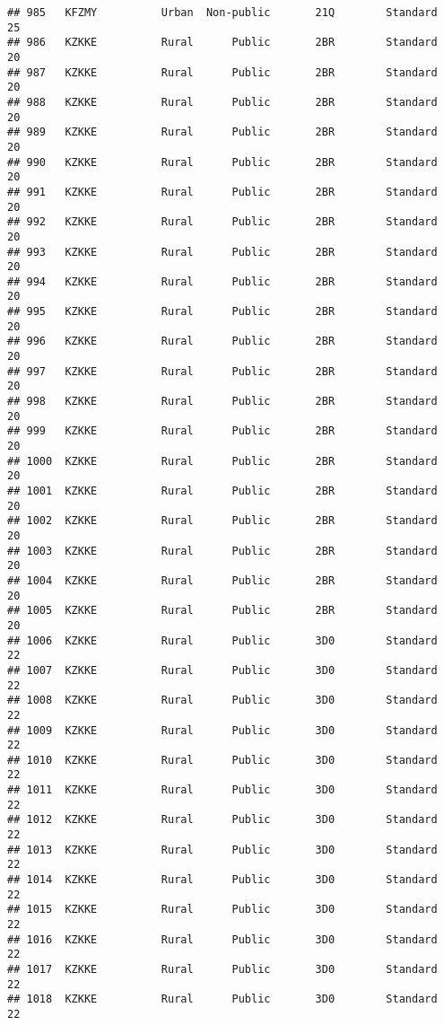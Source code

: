 \documentclass[
]{article}
\begin{document}
\begin{verbatim}
## 985   KFZMY          Urban  Non-public       21Q        Standard        25
## 986   KZKKE          Rural      Public       2BR        Standard        20
## 987   KZKKE          Rural      Public       2BR        Standard        20
## 988   KZKKE          Rural      Public       2BR        Standard        20
## 989   KZKKE          Rural      Public       2BR        Standard        20
## 990   KZKKE          Rural      Public       2BR        Standard        20
## 991   KZKKE          Rural      Public       2BR        Standard        20
## 992   KZKKE          Rural      Public       2BR        Standard        20
## 993   KZKKE          Rural      Public       2BR        Standard        20
## 994   KZKKE          Rural      Public       2BR        Standard        20
## 995   KZKKE          Rural      Public       2BR        Standard        20
## 996   KZKKE          Rural      Public       2BR        Standard        20
## 997   KZKKE          Rural      Public       2BR        Standard        20
## 998   KZKKE          Rural      Public       2BR        Standard        20
## 999   KZKKE          Rural      Public       2BR        Standard        20
## 1000  KZKKE          Rural      Public       2BR        Standard        20
## 1001  KZKKE          Rural      Public       2BR        Standard        20
## 1002  KZKKE          Rural      Public       2BR        Standard        20
## 1003  KZKKE          Rural      Public       2BR        Standard        20
## 1004  KZKKE          Rural      Public       2BR        Standard        20
## 1005  KZKKE          Rural      Public       2BR        Standard        20
## 1006  KZKKE          Rural      Public       3D0        Standard        22
## 1007  KZKKE          Rural      Public       3D0        Standard        22
## 1008  KZKKE          Rural      Public       3D0        Standard        22
## 1009  KZKKE          Rural      Public       3D0        Standard        22
## 1010  KZKKE          Rural      Public       3D0        Standard        22
## 1011  KZKKE          Rural      Public       3D0        Standard        22
## 1012  KZKKE          Rural      Public       3D0        Standard        22
## 1013  KZKKE          Rural      Public       3D0        Standard        22
## 1014  KZKKE          Rural      Public       3D0        Standard        22
## 1015  KZKKE          Rural      Public       3D0        Standard        22
## 1016  KZKKE          Rural      Public       3D0        Standard        22
## 1017  KZKKE          Rural      Public       3D0        Standard        22
## 1018  KZKKE          Rural      Public       3D0        Standard        22

\end{verbatim}
\end{document}

